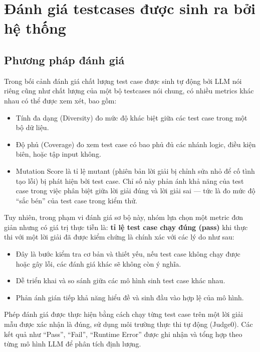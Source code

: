 \section{Đánh giá testcases được sinh ra bởi hệ thống}
\subsection{Phương pháp đánh giá}
Trong bối cảnh đánh giá chất lượng test case được sinh tự động bởi LLM nói riêng cũng như chất lượng của một bộ testcases nói chung, có nhiều metrics khác nhau có thể được xem xét, bao gồm:
\begin{itemize}
    \item Tính đa dạng (Diversity) đo mức độ khác biệt giữa các test case trong một bộ dữ liệu.
    \item Độ phủ (Coverage) đo xem test case có bao phủ đủ các nhánh logic, điều kiện biên, hoặc tập input không.
    \item Mutation Score là tỉ lệ mutant (phiên bản lời giải bị chỉnh sửa nhỏ để cố tình tạo lỗi) bị phát hiện bởi test case. Chỉ số này phản ánh khả năng của test case trong việc phân biệt giữa lời giải đúng và lời giải sai — tức là đo mức độ “sắc bén” của test case trong kiểm thử.

\end{itemize}

Tuy nhiên, trong phạm vi đánh giá sơ bộ này, nhóm lựa chọn một metric đơn giản nhưng có giá trị thực tiễn là: \textbf{tỉ lệ test case chạy đúng (pass)} khi thực thi với một lời giải đã được kiểm chứng là chính xác với các lý do như sau:
\begin{itemize}
    \item Đây là bước kiểm tra cơ bản và thiết yếu, nếu test case không chạy được hoặc gây lỗi, các đánh giá khác sẽ không còn ý nghĩa.
    \item Dễ triển khai và so sánh giữa các mô hình sinh test case khác nhau.
    \item Phản ánh gián tiếp khả năng hiểu đề và sinh đầu vào hợp lệ của mô hình.
\end{itemize}

Phép đánh giá được thực hiện bằng cách chạy từng test case trên một lời giải mẫu được xác nhận là đúng, sử dụng môi trường thực thi tự động (Judge0). Các kết quả như “Pass”, “Fail”, “Runtime Error” được ghi nhận và tổng hợp theo từng mô hình LLM để phân tích định lượng.

